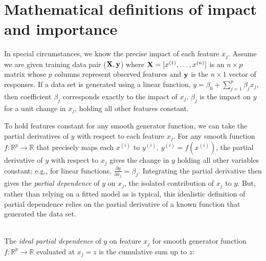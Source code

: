 \documentclass[11pt]{article}
\newcommand{\cut}[1]{}
\newcommand{\todo}[1]{{{\small\color{red}{[#1]}}}}
\renewcommand{\xi}{x^{(i)}}
\begin{document}
\section{Mathematical definitions of impact and importance}\label{sec:def}

\cut{Practitioners loosely define feature importance as feature predictiveness, which presupposes a fitted predictive model, probably because importances are so often used for feature selection during model development.  Research  focuses on more accurately identifying the impact of features upon model predictions.  But, relying on a fitted model makes it difficult to tease apart the true feature importance from the ability of the model to exploit that feature for prediction purposes. Rather than measuring feature impact on {\em model predictions}, we propose avoiding the model completely to define feature importance as the average impact of a feature on the {\em data set response values}.}

In special circumstances, we know the precise impact of each feature $x_j$. Assume we are given training data pair ($\bf X, y$) where ${\bf X} = [x^{(1)}, \ldots, x^{(n)}]$ is an $n \times p$ matrix whose $p$ columns represent observed features and ${\bf y}$ is the $n \times 1$ vector of responses.  If a data set is generated using a linear function, $y = \beta_0 + \sum_{j=1}^p \beta_j x_j$, \todo{assumes independence of $x_j$? I don't think so since we have complete equation} then coefficient $\beta_j$ corresponds exactly to the impact of $x_j$.  $\beta_j$ is the impact on $y$ for a unit change in $x_j$, holding all other features constant.

To hold features constant for any smooth generator function, we can take the partial derivatives of $y$ with respect to each feature $x_j$. For any smooth function $f:\mathbb{R}^{p} \rightarrow \mathbb{R}$ that precisely maps each $\xi$ to $y^{(i)}$, ${y^{(i)}} = f(\xi)$, the partial derivative of $y$ with respect to $x_j$ gives the change in $y$ holding all other variables constant; e.g., for linear functions, $\frac{\partial y}{\partial x_j}=\beta_j$. Integrating the partial derivative then gives the {\em partial dependence}  of $y$ on $x_j$, the isolated contribution of $x_j$ to $y$. But, rather than relying on a fitted model as is typical, this idealistic definition of partial dependence relies on the partial derivative of a known function that generated the data set.

~\\
 The {\em ideal partial dependence} of $y$ on feature $x_j$ for smooth generator function $f:\mathbb{R}^{p} \rightarrow \mathbb{R}$ evaluated at $x_j = z$ is the cumulative sum up to $z$:
\end{document}
